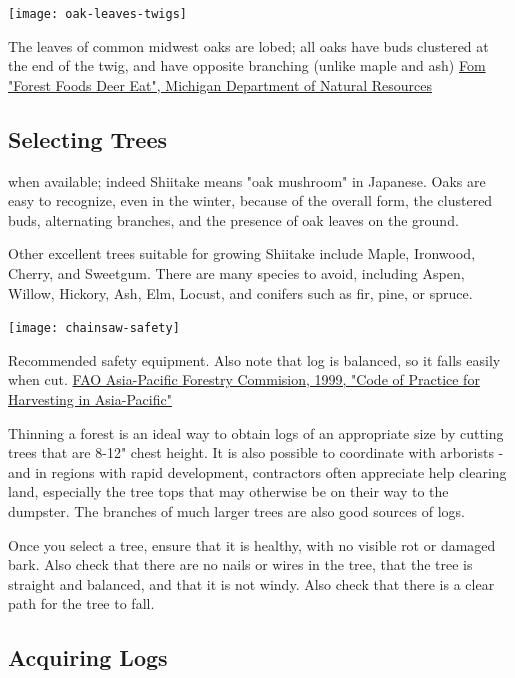 \documentclass{tufte-handout}
\begin{document}
\begin{marginfigure}
\texttt{[image: oak-leaves-twigs]}
\caption{The leaves of common midwest oaks are lobed; all oaks have buds clustered at the end of the twig, and have opposite branching (unlike maple and ash)  
\href{http://www.michigan.gov/dnr/0,4570,7-153-10370_12148-61306--,00.html}{Fom "Forest Foods Deer Eat", Michigan Department of Natural Resources}
}
\end{marginfigure}

\subsection{Selecting Trees}


 when available; indeed Shiitake means "oak mushroom" in Japanese.   
Oaks are easy to recognize, even in the winter, because of the overall form, the clustered buds, alternating branches, and the presence of oak leaves on the ground.  

Other excellent trees suitable for growing Shiitake include Maple, Ironwood, Cherry, and Sweetgum.
There are many species to avoid, including Aspen, Willow, Hickory, Ash, Elm, Locust, and conifers such as fir, pine, or spruce.

\begin{marginfigure}
\texttt{[image: chainsaw-safety]}
\caption{Recommended safety equipment. Also note that log is balanced, so it falls easily when cut. \href{http://www.fao.org/docrep/004/ac142e/ac142e0g.htm}{FAO Asia-Pacific Forestry Commision, 1999, "Code of Practice for Harvesting in Asia-Pacific"}}
\end{marginfigure}

Thinning a forest is an ideal way to obtain logs of an appropriate size by cutting trees that are 8-12" chest height.
It is also possible to coordinate with arborists - and in regions with rapid development, contractors often appreciate help clearing land, especially the tree tops that may otherwise be on their way to the dumpster.
The branches of much larger trees are also good sources of logs.

Once you select a tree, ensure that it is healthy, with no visible rot or damaged bark.
Also check that there are no nails or wires in the tree, that the tree is straight and balanced, and that it is not windy. 
Also check that there is a clear path for the tree to fall.

\subsection{Acquiring Logs}
\end{document}
